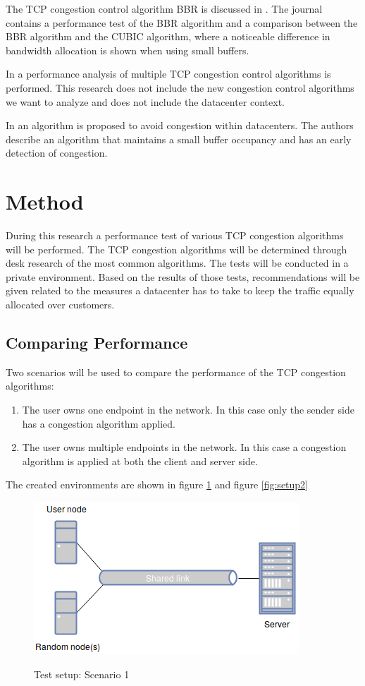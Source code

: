 \documentclass{article}
\begin{document}

The TCP congestion control algorithm BBR is discussed in \cite{bbr-congestion}.
The journal contains a performance test of the BBR algorithm and a comparison
between the BBR algorithm and the CUBIC algorithm, where a noticeable
difference in bandwidth allocation is shown when using small buffers.

In \cite{multiple-congestion} a performance analysis of multiple TCP congestion
control algorithms is performed. This research does not include the new
congestion control algorithms we want to analyze and does not include the
datacenter context.

In \cite{dctcp-congestion-original} an algorithm is proposed to avoid
congestion within datacenters. The authors describe an algorithm that maintains
a small buffer occupancy and has an early detection of congestion.


\section{Method}
During this research a performance test of various TCP congestion algorithms will be performed. The TCP congestion algorithms will be determined through desk research of the most common algorithms. The tests will be conducted in a private environment. Based on the results of those tests, recommendations will be given related to the measures a datacenter has to take to keep the traffic equally allocated over customers. 
	
	\subsection{Comparing Performance}
	Two scenarios will be used to compare the performance of the TCP congestion algorithms:
	\begin{enumerate}
		\item The user owns one endpoint in the network. In this case only the sender side has a congestion algorithm applied.
		\item The user owns multiple endpoints in the network. In this case a congestion algorithm is applied at both the client and server side.
	\end{enumerate}
	
	The created environments are shown in figure \ref{fig:setup1} and figure \ref{fig:setup2}

	\begin{figure}[H] 
		\centering
			\caption{Test setup: Scenario 1}
  			\includegraphics[scale=0.5]{figs/setup1.png}
  		\label{fig:setup1}
	\end{figure}
	
\end{document}
